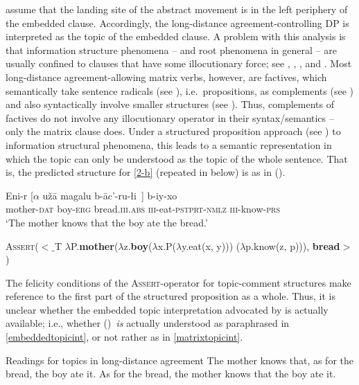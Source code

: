\documentclass[output=paper
,modfonts
,nonflat]{langsci/langscibook}
\begin{document}
\cite{Polinsky&Potsdam:01} assume that the landing site of the
abstract movement is in the left periphery of the embedded
clause. Accordingly, the long-distance agreement-controlling DP is
interpreted as the topic of the embedded clause. A problem with this
analysis is that information structure phenomena -- and root phenomena
in general -- are usually confined to clauses that have some
illocutionary force; see \cite{Hooper&Thompson:73},
    \cite{Ebertetal08}, \cite{Krifkainprep}, and \cite{Maticetal14}. Most long-distance agreement-allowing
matrix verbs, however, are factives, which semantically take sentence
radicals (see \cite{Stenius67}), i.e.~propositions, as complements (see \cite{Krifka04})
 and also syntactically involve smaller
structures (see \cite{deCubaUrogdi10}). Thus, complements of
factives do not involve any illocutionary operator in their
syntax/semantics -- only the matrix clause does. Under a structured
proposition approach  (see \cite{Krifka92}) to information structural
phenomena, this leads to a semantic representation in which the topic
can only be understood as the topic of the whole sentence. That is,
the predicted structure for \ref{2-b}  (repeated in
\Next below) is as in (\NNext).

\ea\label{ex:mueller:13}
\gll    Eni-r [$\alpha$ u\v{z}\={a} \label{2d-b}magalu b-\={a}c'-ru-\l i~] b-iy-xo \\
     mother-{\scshape dat} {} boy-{\scshape erg} bread.{\scshape iii.abs} {\scshape iii}-eat-{\scshape pstprt-nmlz} {\scshape iii}-know-{\scshape prs} \\
\glt      `The mother knows that the boy ate the bread.'
\z

\ea\label{ex:mueller:14} {\scshape Assert}($<$$\_$T $\lambda$P.{\bfseries mother}($\lambda$z.{\bfseries boy}($\lambda$x.P($\lambda$y.eat(x, y))) ($\lambda$p.know(z, p))), {\bfseries bread}$>$)\z

The felicity conditions of the {\scshape Assert}-operator for topic-comment
structures make reference to the first part of the structured
proposition as a whole. Thus, it is unclear whether the embedded topic interpretation
advocated by \cite{Polinsky&Potsdam:01}  is actually available;
i.e.,  whether (\LLast)\ {\itshape is} actually understood as paraphrased in \ref{embeddedtopicint}, or not rather as in \ref{matrixtopicint}.
   
\ea\label{ex:mueller:15} Readings for topics in long-distance agreement
\ea \label{embeddedtopicint}The mother knows that, as for the bread, the boy ate it.
\ex \label{matrixtopicint}As for the bread, the mother knows that the boy ate it.
\z
\z
\end{document}
